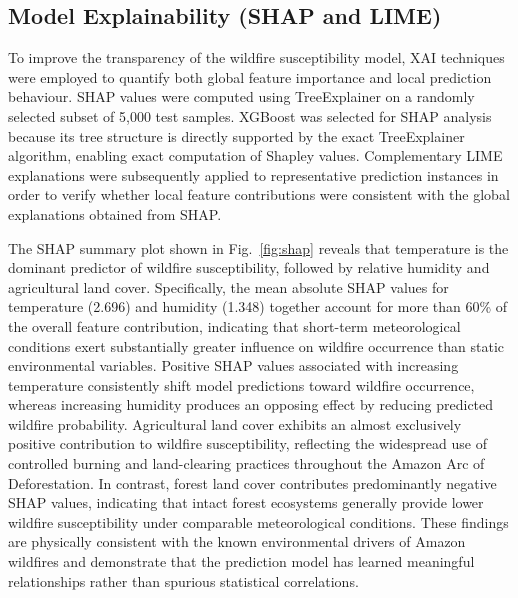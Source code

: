 \documentclass{ieeeaccess}
\begin{document}
\subsection{Model Explainability (SHAP and LIME)}
\label{sec:xai-results}

To improve the transparency of the wildfire susceptibility model, XAI techniques were employed to quantify both global feature importance and local prediction behaviour. SHAP values were computed using TreeExplainer on a randomly selected subset of 5,000 test samples. XGBoost was selected for SHAP analysis because its tree structure is directly supported by the exact TreeExplainer algorithm, enabling exact computation of Shapley values. Complementary LIME explanations were subsequently applied to representative prediction instances in order to verify whether local feature contributions were consistent with the global explanations obtained from SHAP.

The SHAP summary plot shown in Fig.~\ref{fig:shap} reveals that temperature is the dominant predictor of wildfire susceptibility, followed by relative humidity and agricultural land cover. Specifically, the mean absolute SHAP values for temperature (2.696) and humidity (1.348) together account for more than 60\% of the overall feature contribution, indicating that short-term meteorological conditions exert substantially greater influence on wildfire occurrence than static environmental variables. Positive SHAP values associated with increasing temperature consistently shift model predictions toward wildfire occurrence, whereas increasing humidity produces an opposing effect by reducing predicted wildfire probability. Agricultural land cover exhibits an almost exclusively positive contribution to wildfire susceptibility, reflecting the widespread use of controlled burning and land-clearing practices throughout the Amazon Arc of Deforestation. In contrast, forest land cover contributes predominantly negative SHAP values, indicating that intact forest ecosystems generally provide lower wildfire susceptibility under comparable meteorological conditions. These findings are physically consistent with the known environmental drivers of Amazon wildfires and demonstrate that the prediction model has learned meaningful relationships rather than spurious statistical correlations.
\end{document}
